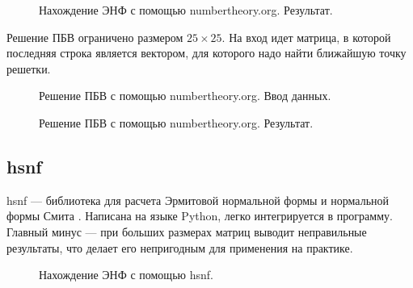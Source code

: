 \begin{figure}[H]
\caption{Нахождение ЭНФ с помощью numbertheory.org. Результат.}
\label{fig:HNF_NT_RESULT}
\end{figure}

Решение ПБВ ограничено размером $ 25 \times 25 $. На вход идет матрица, в которой последняя строка является вектором, для которого надо найти ближайшую точку решетки. 

\begin{figure}[H]
\caption{Решение ПБВ с помощью numbertheory.org. Ввод данных.}
\label{fig:CVP_NT_INPUT}
\end{figure}

\begin{figure}[H]
\caption{Решение ПБВ с помощью numbertheory.org. Результат.}
\label{fig:HNF_NT_RESULT}
\end{figure}

\subsection{hsnf}

hsnf --- библиотека для расчета Эрмитовой нормальной формы и нормальной формы Смита \cite{hsnf}. Написана на языке Python, легко интегрируется в программу. Главный минус --- при больших размерах матриц выводит неправильные результаты, что делает его непригодным для применения на практике.

\begin{figure}[H]
\caption{Нахождение ЭНФ с помощью hsnf.}
\label{fig:HNF_NT_RESULT}
\end{figure}


\clearpage